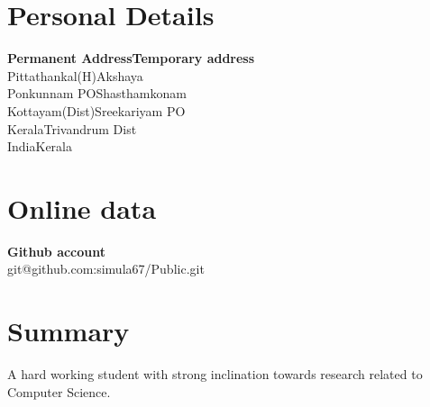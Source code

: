 \documentclass[line,margin]{res}
\begin{document}
\begin{resume}
\section{Personal Details}
{\bf Permanent Address}\hfill {\bf Temporary address}\\
Pittathankal(H)\hfill Akshaya\\
Ponkunnam PO\hfill Shasthamkonam\\
Kottayam(Dist)\hfill Sreekariyam PO\\
Kerala\hfill Trivandrum Dist\\
India\hfill Kerala\\

\section{Online data}
{\bf Github account}\\
git@github.com:simula67/Public.git


\section{Summary}
A hard working student with strong inclination towards research related to Computer Science.
\end{resume}
\end{document}
